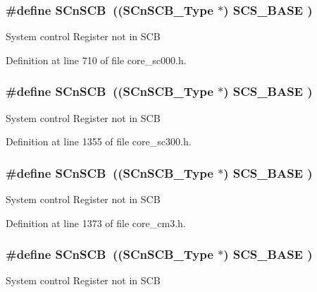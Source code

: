 \subsubsection[{\texorpdfstring{S\+Cn\+S\+CB}{SCnSCB}}]{\setlength{\rightskip}{0pt plus 5cm}\#define S\+Cn\+S\+CB~(({\bf S\+Cn\+S\+C\+B\+\_\+\+Type}    $\ast$)     {\bf S\+C\+S\+\_\+\+B\+A\+SE}      )}\hypertarget{group___c_m_s_i_s__core__base_ga9fe0cd2eef83a8adad94490d9ecca63f}{}\label{group___c_m_s_i_s__core__base_ga9fe0cd2eef83a8adad94490d9ecca63f}
System control Register not in S\+CB 

Definition at line 710 of file core\+\_\+sc000.\+h.

\subsubsection[{\texorpdfstring{S\+Cn\+S\+CB}{SCnSCB}}]{\setlength{\rightskip}{0pt plus 5cm}\#define S\+Cn\+S\+CB~(({\bf S\+Cn\+S\+C\+B\+\_\+\+Type}    $\ast$)     {\bf S\+C\+S\+\_\+\+B\+A\+SE}      )}\hypertarget{group___c_m_s_i_s__core__base_ga9fe0cd2eef83a8adad94490d9ecca63f}{}\label{group___c_m_s_i_s__core__base_ga9fe0cd2eef83a8adad94490d9ecca63f}
System control Register not in S\+CB 

Definition at line 1355 of file core\+\_\+sc300.\+h.

\subsubsection[{\texorpdfstring{S\+Cn\+S\+CB}{SCnSCB}}]{\setlength{\rightskip}{0pt plus 5cm}\#define S\+Cn\+S\+CB~(({\bf S\+Cn\+S\+C\+B\+\_\+\+Type}    $\ast$)     {\bf S\+C\+S\+\_\+\+B\+A\+SE}      )}\hypertarget{group___c_m_s_i_s__core__base_ga9fe0cd2eef83a8adad94490d9ecca63f}{}\label{group___c_m_s_i_s__core__base_ga9fe0cd2eef83a8adad94490d9ecca63f}
System control Register not in S\+CB 

Definition at line 1373 of file core\+\_\+cm3.\+h.

\subsubsection[{\texorpdfstring{S\+Cn\+S\+CB}{SCnSCB}}]{\setlength{\rightskip}{0pt plus 5cm}\#define S\+Cn\+S\+CB~(({\bf S\+Cn\+S\+C\+B\+\_\+\+Type}    $\ast$)     {\bf S\+C\+S\+\_\+\+B\+A\+SE}      )}\hypertarget{group___c_m_s_i_s__core__base_ga9fe0cd2eef83a8adad94490d9ecca63f}{}\label{group___c_m_s_i_s__core__base_ga9fe0cd2eef83a8adad94490d9ecca63f}
System control Register not in S\+CB 

